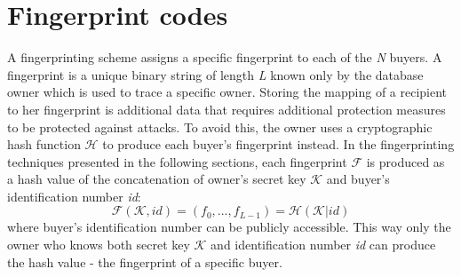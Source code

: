 \section{Fingerprint codes}
A fingerprinting scheme assigns a specific fingerprint to each of the \textit{N} buyers.
A fingerprint is a unique binary string of length \textit{L} known only by the database owner which is used to trace a specific owner. 
Storing the mapping of a recipient to her fingerprint is additional data that requires additional protection measures to be protected against attacks.  
To avoid this, the owner uses a cryptographic hash function $\mathcal{H}$ to produce each buyer's fingerprint instead.
In the fingerprinting techniques presented in the following sections, each fingerprint $\mathcal{F}$ is produced as a hash value of the concatenation of owner's secret key $\mathcal{K}$ and buyer's identification number \textit{id}:
\begin{equation}
    \mathcal{F}(\mathcal{K},id)=(f_0,...,f_{L-1})=\mathcal{H}(\mathcal{K}|id)
\end{equation}
where buyer's identification number can be publicly accessible.
This way only the owner who knows both secret key $\mathcal{K}$ and identification number \textit{id} can produce the hash value - the fingerprint of a specific buyer.

